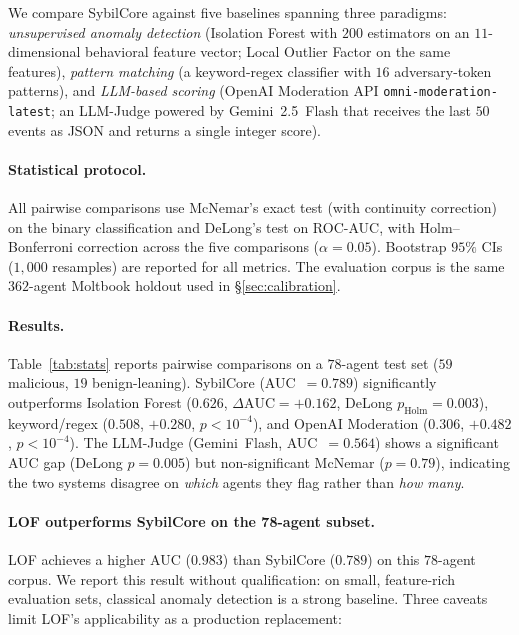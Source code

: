 \documentclass{article}
\begin{document}
We compare SybilCore against five baselines spanning three paradigms:
\emph{unsupervised anomaly detection} (Isolation Forest with $200$
estimators on an $11$-dimensional behavioral feature vector; Local
Outlier Factor on the same features), \emph{pattern matching}
(a keyword-regex classifier with $16$ adversary-token patterns), and
\emph{LLM-based scoring} (OpenAI Moderation API
\texttt{omni-moderation-latest}; an LLM-Judge powered by
Gemini~2.5~Flash that receives the last $50$ events as JSON and
returns a single integer score).

\paragraph{Statistical protocol.}
All pairwise comparisons use McNemar's exact test (with continuity
correction) on the binary classification and DeLong's test on
ROC-AUC, with Holm--Bonferroni correction across the five
comparisons ($\alpha = 0.05$). Bootstrap $95\%$ CIs ($1{,}000$
resamples) are reported for all metrics. The evaluation corpus is the
same $362$-agent Moltbook holdout used in \S\ref{sec:calibration}.

\paragraph{Results.}
Table~\ref{tab:stats} reports pairwise comparisons on a $78$-agent
test set ($59$ malicious, $19$ benign-leaning). SybilCore
(AUC~$= 0.789$) significantly outperforms Isolation Forest
($0.626$, $\Delta\mathrm{AUC} = +0.162$, DeLong
$p_\mathrm{Holm} = 0.003$), keyword/regex ($0.508$,
$+0.280$, $p < 10^{-4}$), and OpenAI Moderation ($0.306$,
$+0.482$, $p < 10^{-4}$). The LLM-Judge (Gemini~Flash,
AUC~$= 0.564$) shows a significant AUC gap (DeLong $p = 0.005$)
but non-significant McNemar ($p = 0.79$), indicating the two
systems disagree on \emph{which} agents they flag rather than
\emph{how many}.

\paragraph{LOF outperforms SybilCore on the 78-agent subset.}
LOF achieves a higher AUC ($0.983$) than SybilCore ($0.789$) on
this $78$-agent corpus. We report this result without qualification:
on small, feature-rich evaluation sets, classical anomaly detection
is a strong baseline. Three caveats limit LOF's applicability as
a production replacement:
\end{document}

